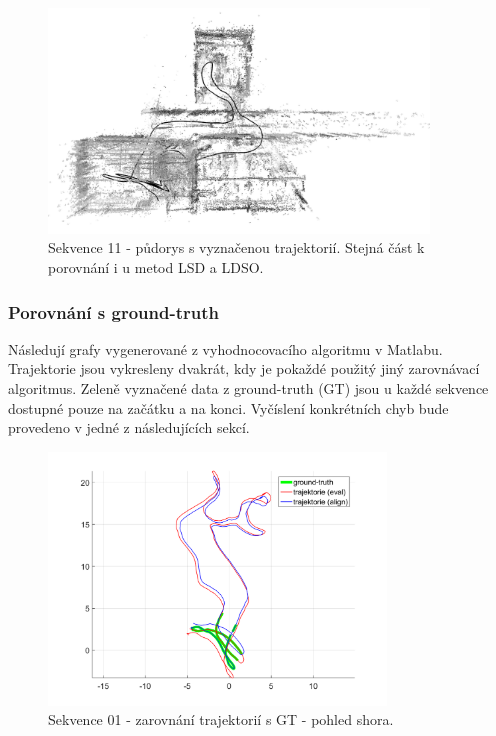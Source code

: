 \documentclass[12pt,a4paper]{article}
\begin{document}
\begin{figure}[H]
\centering
\includegraphics[width=0.9\textwidth]{img/DSO_11_top_b.png}
\caption{Sekvence 11 - půdorys s vyznačenou trajektorií. Stejná část k porovnání i u metod LSD a LDSO.}
\end{figure} 

\subsubsection*{Porovnání s ground-truth}
Následují grafy vygenerované z vyhodnocovacího algoritmu v Matlabu. Trajektorie jsou vykresleny dvakrát, kdy je pokaždé použitý jiný zarovnávací algoritmus. Zeleně vyznačené data z ground-truth (GT) jsou u každé sekvence dostupné pouze na začátku a na konci. Vyčíslení konkrétních chyb bude provedeno v jedné z následujících sekcí.

\begin{figure}[H]
\centering
\includegraphics[width=0.8\textwidth]{img/m_dso_01_2.png}
\caption{Sekvence 01 - zarovnání trajektorií s GT - pohled shora.}
\end{figure}
\end{document}
